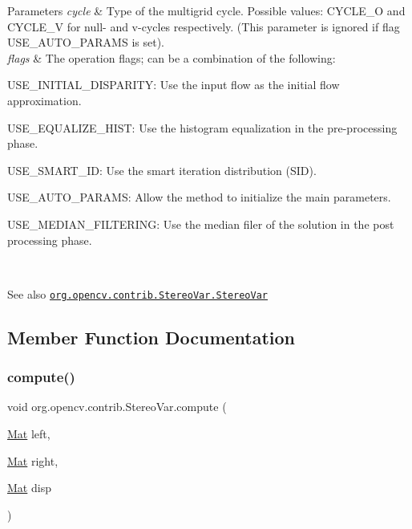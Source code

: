 \begin{DoxyParams}{Parameters}
\hline
{\em cycle} & Type of the multigrid cycle. Possible values\+: C\+Y\+C\+L\+E\+\_\+O and C\+Y\+C\+L\+E\+\_\+V for null-\/ and v-\/cycles respectively. (This parameter is ignored if flag U\+S\+E\+\_\+\+A\+U\+T\+O\+\_\+\+P\+A\+R\+A\+MS is set). \\
\hline
{\em flags} & The operation flags; can be a combination of the following\+: 
\begin{DoxyItemize}
\item U\+S\+E\+\_\+\+I\+N\+I\+T\+I\+A\+L\+\_\+\+D\+I\+S\+P\+A\+R\+I\+TY\+: Use the input flow as the initial flow approximation. 
\item U\+S\+E\+\_\+\+E\+Q\+U\+A\+L\+I\+Z\+E\+\_\+\+H\+I\+ST\+: Use the histogram equalization in the pre-\/processing phase. 
\item U\+S\+E\+\_\+\+S\+M\+A\+R\+T\+\_\+\+ID\+: Use the smart iteration distribution (S\+ID). 
\item U\+S\+E\+\_\+\+A\+U\+T\+O\+\_\+\+P\+A\+R\+A\+MS\+: Allow the method to initialize the main parameters. 
\item U\+S\+E\+\_\+\+M\+E\+D\+I\+A\+N\+\_\+\+F\+I\+L\+T\+E\+R\+I\+NG\+: Use the median filer of the solution in the post processing phase. 
\end{DoxyItemize}\\
\hline
\end{DoxyParams}
\begin{DoxySeeAlso}{See also}
\href{http://docs.opencv.org/modules/contrib/doc/stereo.html#stereovar-stereovar}{\tt org.\+opencv.\+contrib.\+Stereo\+Var.\+Stereo\+Var} 
\end{DoxySeeAlso}


\subsection{Member Function Documentation}
\mbox{\label{classorg_1_1opencv_1_1contrib_1_1_stereo_var_a851ce0ae26e06ad2548ee7aabf7d89ec}} 
\subsubsection{\texorpdfstring{compute()}{compute()}}
{\footnotesize\ttfamily void org.\+opencv.\+contrib.\+Stereo\+Var.\+compute (\begin{DoxyParamCaption}\item[{\mbox{\hyperlink{classorg_1_1opencv_1_1core_1_1_mat}{Mat}}}]{left,  }\item[{\mbox{\hyperlink{classorg_1_1opencv_1_1core_1_1_mat}{Mat}}}]{right,  }\item[{\mbox{\hyperlink{classorg_1_1opencv_1_1core_1_1_mat}{Mat}}}]{disp }\end{DoxyParamCaption})}

